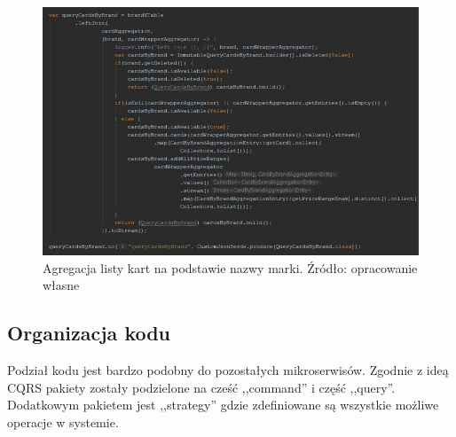 \begin{figure}[h!]
  \centering
    \includegraphics[width=1.0\textwidth]{images/streamsquery1.JPG}
  \caption{Agregacja listy kart na podstawie nazwy marki. Źródło: opracowanie własne }
\end{figure}
\FloatBarrier
\subsection{Organizacja kodu}
Podział kodu jest bardzo podobny do pozostałych mikroserwisów. Zgodnie z ideą CQRS pakiety zostały podzielone na cześć ,,command'' i część ,,query''. Dodatkowym pakietem jest ,,strategy'' gdzie zdefiniowane są wszystkie możliwe operacje w systemie.

